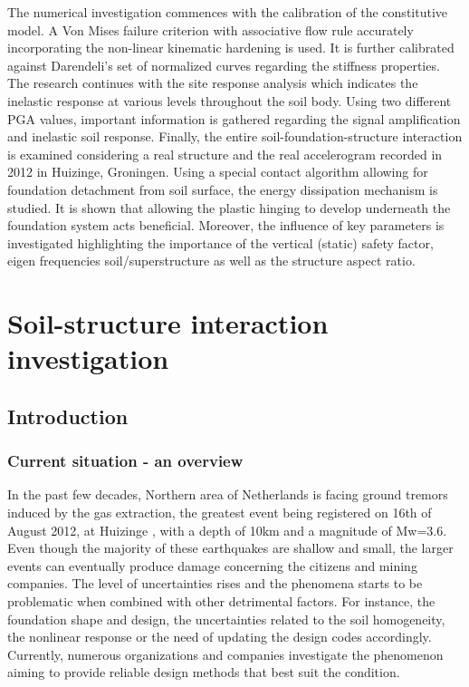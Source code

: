 \documentclass[11pt,a4paper]{report}
\newcommand\blankpage{%
	\null
	\thispagestyle{empty}%
	\addtocounter{page}{-1}%
	\newpage}
\begin{document}
The numerical investigation commences with the calibration of the constitutive model. A Von Mises failure criterion with associative flow rule accurately incorporating the non-linear kinematic hardening is used. It is further calibrated against Darendeli's set of normalized curves regarding the stiffness properties. The research continues with the site response analysis which indicates the inelastic response at various levels throughout the soil body. Using two different PGA values, important information is gathered regarding the signal amplification and inelastic soil response. Finally, the entire soil-foundation-structure interaction is examined considering a real structure and the real accelerogram recorded in 2012 in Huizinge, Groningen. Using a special contact algorithm allowing for foundation detachment from soil surface, the energy dissipation mechanism is studied. It is shown that allowing the plastic hinging to develop underneath the foundation system acts beneficial. Moreover, the influence of key parameters is investigated highlighting the importance of the vertical (static) safety factor, eigen frequencies soil/superstructure as well as the structure aspect ratio. 


\tableofcontents
\printnoidxglossaries

\part{Soil-structure interaction investigation}


\afterpage{\blankpage}
\setcounter{page}{1}
\chapter{Introduction}
\section{Current situation - an overview}
In the past few decades, Northern area of Netherlands is facing ground tremors induced by the gas extraction, the greatest event being registered on 16th of August 2012, at Huizinge \cite{dost2013august}, with a depth of 10km and a magnitude of \gls{Mw}=3.6. Even though the majority of these earthquakes are shallow and small, the larger events can eventually produce damage concerning the citizens and mining companies. The level of uncertainties rises and the phenomena starts to be problematic when combined with other detrimental factors. For instance, the foundation shape and design, the uncertainties related to the soil homogeneity, the nonlinear response or the need of updating the design codes accordingly. Currently, numerous organizations and companies investigate the phenomenon aiming to provide reliable design methods that best suit the condition. 
\end{document}

